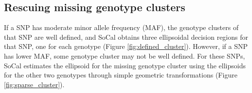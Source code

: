 \documentclass{scrartcl}
\begin{document}
\subsection{Rescuing missing genotype clusters}
\par
If a SNP has moderate minor allele frequency (MAF), the genotype clusters of
that SNP are well defined, and SoCal obtains three ellipsoidal decision
regions for that SNP, one for each genotype (Figure \ref{fig:defined_cluster}).
However, if a SNP has lower MAF, some genotype cluster may not be well defined.
For these SNPs, SoCal estimates the ellipsoid for the missing genotype cluster
using the ellipsoids for the other two genotypes through simple geometric
transformations (Figure \ref{fig:sparse_cluster}).

\begin{figure}[H]
    \centering
\end{figure}
\end{document}
